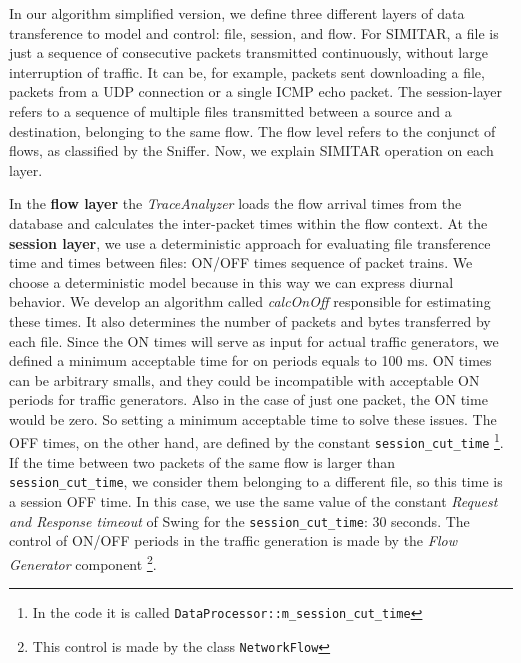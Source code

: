 In our algorithm simplified version, we define three different layers of data transference to model and control: file, session, and flow. For SIMITAR, a file is just a sequence of consecutive packets transmitted continuously, without large interruption of traffic. It can be, for example, packets sent downloading a file, packets from a  UDP  connection or a single ICMP echo packet. The session-layer refers to a sequence of multiple files transmitted between a source and a destination, belonging to the same flow.  The flow level refers to the conjunct of flows, as classified by the Sniffer.  Now, we explain SIMITAR operation on each layer. 


In the \textbf{flow layer} the \textit{TraceAnalyzer} loads the flow arrival times from the database and calculates the inter-packet times within the flow context. At the \textbf{session layer}, we use a deterministic approach for evaluating file transference time and times between files: ON/OFF times sequence of packet trains. We choose a deterministic model because in this way we can express diurnal behavior\cite{harpoon-paper}.  We develop an algorithm called \textit{calcOnOff} responsible for estimating these times. It also determines the number of packets and bytes transferred by each file. Since the ON times will serve as input for actual traffic generators, we defined a minimum acceptable time for on periods equals to 100 ms. ON times can be arbitrary smalls, and they could be incompatible with acceptable ON periods for traffic generators. Also in the case of just one packet, the ON time would be zero. So setting a minimum acceptable time to solve these issues. The OFF times, on the other hand, are defined by the constant \texttt{session\_cut\_time} \footnote{In the code it is called \texttt{DataProcessor::m\_session\_cut\_time} }. If the time between two packets of the same flow is larger than \texttt{session\_cut\_time}, we consider them belonging to a different file, so this time is a session OFF time. In this case, we use the same value of the constant \textit{Request and Response timeout} of Swing\cite{swing-paper} for the \texttt{session\_cut\_time}: 30 seconds. The control of ON/OFF periods in the traffic generation is made by the \textit{Flow Generator} component \footnote{This control is made by the class \texttt{NetworkFlow}}.


